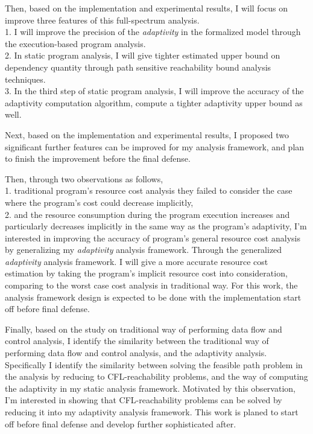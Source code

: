    Then, based on the implementation and experimental results, 
   I will focus on improve three features of this full-spectrum analysis.
   \\
   1. I will improve the precision of the \emph{adaptivity} in the formalized model through the execution-based program analysis.
   \\
   2. In static program analysis, I will give tighter estimated upper bound on dependency quantity through 
   path sensitive reachability bound analysis techniques. 
   \\
   3. In the third step of static program analysis, I will improve the accuracy of the adaptivity computation algorithm,
   compute a tighter adaptivity upper bound as well.

   Next, based on the implementation and experimental results, I proposed two significant 
   further features can be improved for my analysis framework, and plan to finish the improvement 
   before the final defense.
   
   Then, through two observations as follows,
  \\
  1. traditional program's resource cost analysis they failed to consider the case where the program's cost could decrease 
   implicitly, 
   \\
   2. and 
   the resource consumption during the program 
   execution increases and particularly decreases implicitly in the same way as the program's adaptivity, 
   I'm interested in improving the accuracy of program's general resource cost analysis
   by generalizing my \emph{adaptivity} analysis framework.
   Through the generalized \emph{adaptivity} analysis framework.
   I will give
   a more accurate resource cost estimation by taking the program's implicit resource cost into consideration, comparing 
   to the worst case cost analysis in traditional way.
   For this work, the analysis framework design is expected to be done with the implementation start off before final defense.


   Finally, based on the study on traditional way of performing data flow and control analysis,
   I identify the similarity between the traditional way of performing data flow and control analysis, and the 
   adaptivity analysis.  
   Specifically I identify the similarity between 
   solving the feasible path problem in the analysis by reducing to CFL-reachability problems,
   and the way of computing the adaptivity in my static analysis framework.
   Motivated by this observation, 
   I'm interested in showing that
   CFL-reachability problems can be solved by reducing it into my adaptivity analysis framework. 
   This work is planed to start off before final defense and develop further sophisticated after.
